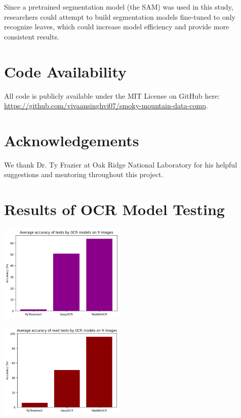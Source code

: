 \documentclass[final,5p,times,twocolumn,authoryear]{elsarticle}
\begin{document}
Since a pretrained segmentation model (the SAM) was used in this study, researchers could attempt to build segmentation models fine-tuned to only recognize leaves, which could increase model efficiency and provide more consistent results.

\section{Code Availability}
\label{code}

All code is publicly available under the MIT License on GitHub here: \url{https://github.com/vivaansinghvi07/smoky-mountain-data-comp}.

\section*{Acknowledgements}
\label{acknowledgements}

We thank Dr. Ty Frazier at Oak Ridge National Laboratory for his helpful suggestions and mentoring throughout this project.




\newpage
\appendix

\section{Results of OCR Model Testing}
\label{app_ocr_testing}

\begin{center}
	\includegraphics[width=0.45\textwidth]{images/ocr_average_accuracy.png}	
\end{center}

\begin{center}
	\includegraphics[width=0.45\textwidth]{images/pruned_ocr_average_accuracy.png}	
\end{center}
\end{document}
